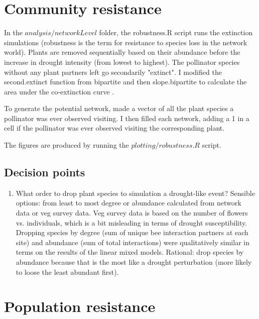 \documentclass{article}\usepackage[]{graphicx}\usepackage[]{color}
\begin{document}
\section{Community resistance}
\label{sec:comm_resist}

In the $analysis/networkLevel$ folder, the robustness.R script runs
the extinction simulations (robustness is the term for resistance to
species loss in the network world). Plants are removed sequentially
based on their abundance before the increase in drought intensity
(from lowest to highest). The pollinator species without any plant
partners left go secondarily "extinct". I modified the second.extinct
function from bipartite and then slope.bipartite to calculate the area
under the co-extinction curve \citep{Memmott2004}.

To generate the potential network, made a vector of all the plant
species a pollinator was ever observed visiting. I then filled each
network, adding a 1 in a cell if the pollinator was ever observed
visiting the corresponding plant.

The figures are produced by running the $plotting/robustness.R$ script.

  \subsection{Decision points}
  \label{sec:comm_resist_dp}
  \begin{enumerate}
  \item What order to drop plant species to simulation a drought-like
    event? Sensible options: from least to most degree or abundance
    calculated from network data or veg survey data. Veg survey data
    is based on the number of flowers vs. individuals, which is a bit
    misleading in terms of drought susceptibility. Dropping species by
    degree (sum of unique bee interaction partners at each site) and
    abundance (sum of total interactions) were qualitatively similar
    in terms on the results of the linear mixed models. Rational: drop
    species by abundance because that is the most like a drought
    perturbation (more likely to loose the least abundant first).
  \end{enumerate}

\section{Population resistance}
  \label{sec:pop_resist}
\end{document}
